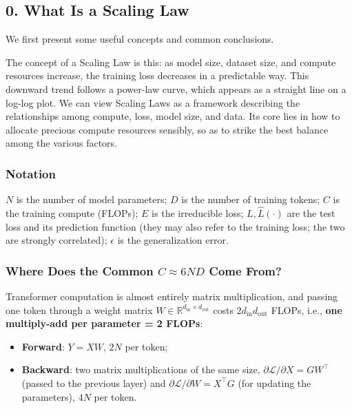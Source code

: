 \documentclass[
  english,
  11pt,
  a4paper,
]{article}
\providecommand{\tightlist}{%
  \setlength{\itemsep}{0pt}\setlength{\parskip}{0pt}}
\newcommand{\NotesCoverEnd}{%
  \clearpage
  \pagenumbering{arabic}%
}
\begin{document}
\endgroup

\NotesCoverEnd

\subsection{0. What Is a Scaling Law}\label{what-is-a-scaling-law}

We first present some useful concepts and common conclusions.

The concept of a Scaling Law is this: as model size, dataset size, and
compute resources increase, the training loss decreases in a predictable
way. This downward trend follows a power-law curve, which appears as a
straight line on a log-log plot. We can view Scaling Laws as a framework
describing the relationships among compute, loss, model size, and data.
Its core lies in how to allocate precious compute resources sensibly, so
as to strike the best balance among the various factors.

\subsubsection{Notation}\label{notation}

\(N\) is the number of model parameters; \(D\) is the number of training
tokens; \(C\) is the training compute (FLOPs); \(E\) is the irreducible
loss; \(L,\hat L(\cdot)\) are the test loss and its prediction function
(they may also refer to the training loss; the two are strongly
correlated); \(\epsilon\) is the generalization error.

\subsubsection{\texorpdfstring{Where Does the Common \(C\approx6ND\)
Come
From?}{Where Does the Common C\textbackslash approx6ND Come From?}}\label{where-does-the-common-capprox6nd-come-from}

Transformer computation is almost entirely matrix multiplication, and
passing one token through a weight matrix
\(W\in\mathbb R^{d_{\mathrm{in}}\times d_{\mathrm{out}}}\) costs
\(2d_{\mathrm{in}}d_{\mathrm{out}}\) FLOPs, i.e., \textbf{one
multiply-add per parameter = 2 FLOPs}:

\begin{itemize}
\tightlist
\item
  \textbf{Forward}: \(Y=XW\), \(2N\) per token;
\item
  \textbf{Backward}: two matrix multiplications of the same size,
  \(\partial\mathcal L/\partial X=GW^\top\) (passed to the previous
  layer) and \(\partial\mathcal L/\partial W=X^\top G\) (for updating
  the parameters), \(4N\) per token.
\end{itemize}
\end{document}
